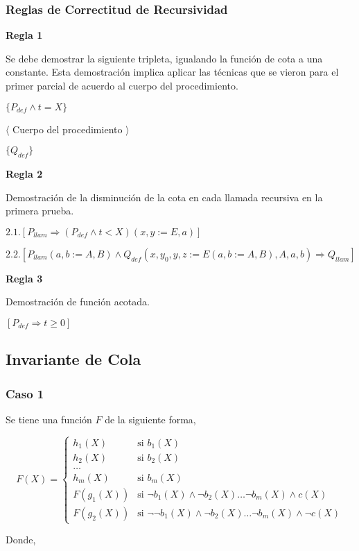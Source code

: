 \documentclass[hidelinks]{article}
\begin{document}
\subsubsection{Reglas de Correctitud de Recursividad}

\textbf{Regla 1}\par
Se debe demostrar la siguiente tripleta, igualando la función de cota a una
constante. Esta demostración implica aplicar las técnicas que se vieron para el
primer parcial de acuerdo al cuerpo del procedimiento.\par
$\{P_{def} \land t = X\}$\par
$\langle$ Cuerpo del procedimiento $\rangle$\par
$\{Q_{def}\}$\par

\textbf{Regla 2}\par
Demostración de la disminución de la cota en cada llamada recursiva en la
primera prueba.\par
$2.1. [P_{llam} \Rightarrow (P_{def} \land t < X)(x,y := E, a)]$\par
$2.2. [P_{llam}(a,b := A,B) \land Q_{def}(x,y_0,y,z := E(a,b := A,B), A, a, b) \Rightarrow Q_{llam}]$\par

\textbf{Regla 3}\par
Demostración de función acotada.\par
$[P_{def} \Rightarrow t \geq 0]$\par

\subsection{Invariante de Cola}\par

\subsubsection{Caso 1}

Se tiene una función $F$ de la siguiente forma,\par

\begin{equation}
	F(X) =
	\begin{cases}
		h_1(X)    & \text{si } b_1(X)                                                               \\
		h_2(X)    & \text{si } b_2(X)                                                               \\
		\dots                                                                                       \\
		h_m(X)    & \text{si } b_m(X)                                                               \\
		F(g_1(X)) & \text{si } \neg b_1(X) \land \neg b_2(X) \dots \neg b_m(X) \land c(X)           \\
		F(g_2(X)) & \text{si } \neg \neg b_1(X) \land \neg b_2(X) \dots \neg b_m(X) \land \neg c(X)
	\end{cases}
\end{equation} \par
Donde,\par
\end{document}
